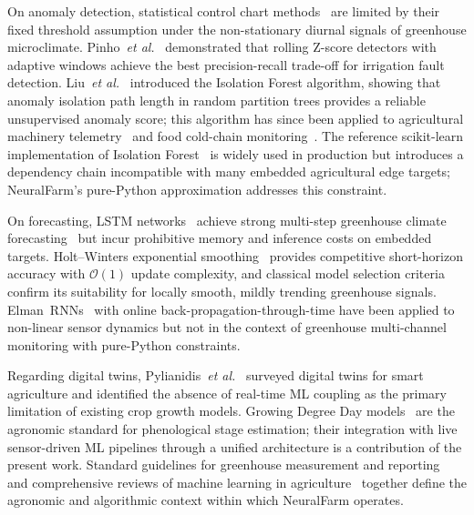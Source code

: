 \documentclass[journal,10pt,twocolumn]{IEEEtran}
\begin{document}
On anomaly detection, statistical control chart methods~\cite{Montgomery2020}
are limited by their fixed threshold assumption under the non-stationary
diurnal signals of greenhouse microclimate.
Pinho~\textit{et al.}~\cite{Pinho2020} demonstrated that rolling
Z-score detectors with adaptive windows achieve the best
precision-recall trade-off for irrigation fault detection.
Liu~\textit{et al.}~\cite{Liu2008} introduced the Isolation Forest
algorithm, showing that anomaly isolation path length in random
partition trees provides a reliable unsupervised anomaly score; this
algorithm has since been applied to agricultural machinery
telemetry~\cite{Zhang2019} and food cold-chain monitoring~\cite{James2022}.
The reference scikit-learn implementation of Isolation Forest~\cite{Pedregosa2011}
is widely used in production but introduces a dependency chain
incompatible with many embedded agricultural edge targets;
NeuralFarm's pure-Python approximation addresses this constraint.

On forecasting, LSTM networks~\cite{Hochreiter1997} achieve strong
multi-step greenhouse climate forecasting~\cite{Ferreira2012} but
incur prohibitive memory and inference costs on embedded targets.
Holt--Winters exponential smoothing~\cite{HoltWinters1960} provides
competitive short-horizon accuracy with $\mathcal{O}(1)$ update
complexity, and classical model selection criteria~\cite{Akaike1974}
confirm its suitability for locally smooth, mildly trending greenhouse
signals.
Elman~RNNs~\cite{Elman1990} with online back-propagation-through-time
have been applied to non-linear sensor dynamics but not in the context
of greenhouse multi-channel monitoring with pure-Python constraints.

Regarding digital twins, Pylianidis~\textit{et al.}~\cite{Pylianidis2021}
surveyed digital twins for smart agriculture and identified the absence
of real-time ML coupling as the primary limitation of existing crop
growth models.
Growing Degree Day models~\cite{McMaster1997} are the agronomic
standard for phenological stage estimation; their integration with
live sensor-driven ML pipelines through a unified architecture is a
contribution of the present work.
Standard guidelines for greenhouse measurement and reporting~\cite{Both2015}
and comprehensive reviews of machine learning in
agriculture~\cite{Liakos2018} together define the agronomic and
algorithmic context within which NeuralFarm operates.
\end{document}
